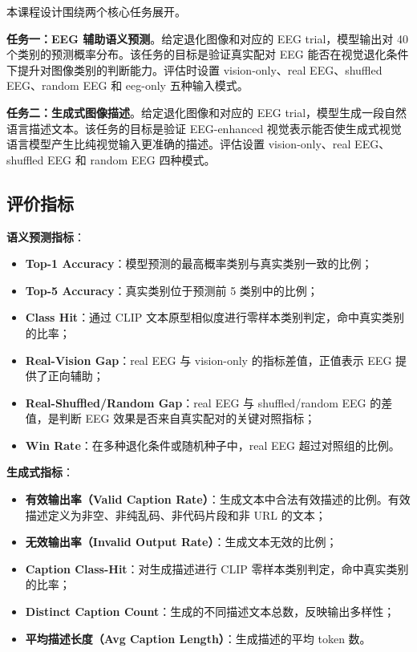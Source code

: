 本课程设计围绕两个核心任务展开。

\textbf{任务一：EEG 辅助语义预测}。给定退化图像和对应的 EEG trial，模型输出对 40 个类别的预测概率分布。该任务的目标是验证真实配对 EEG 能否在视觉退化条件下提升对图像类别的判断能力。评估时设置 vision-only、real EEG、shuffled EEG、random EEG 和 eeg-only 五种输入模式。

\textbf{任务二：生成式图像描述}。给定退化图像和对应的 EEG trial，模型生成一段自然语言描述文本。该任务的目标是验证 EEG-enhanced 视觉表示能否使生成式视觉语言模型产生比纯视觉输入更准确的描述。评估设置 vision-only、real EEG、shuffled EEG 和 random EEG 四种模式。

\subsection{评价指标}

\textbf{语义预测指标}：

\begin{itemize}
  \item \textbf{Top-1 Accuracy}：模型预测的最高概率类别与真实类别一致的比例；
  \item \textbf{Top-5 Accuracy}：真实类别位于预测前 5 类别中的比例；
  \item \textbf{Class Hit}：通过 CLIP 文本原型相似度进行零样本类别判定，命中真实类别的比率；
  \item \textbf{Real-Vision Gap}：real EEG 与 vision-only 的指标差值，正值表示 EEG 提供了正向辅助；
  \item \textbf{Real-Shuffled/Random Gap}：real EEG 与 shuffled/random EEG 的差值，是判断 EEG 效果是否来自真实配对的关键对照指标；
  \item \textbf{Win Rate}：在多种退化条件或随机种子中，real EEG 超过对照组的比例。
\end{itemize}

\textbf{生成式指标}：

\begin{itemize}
  \item \textbf{有效输出率（Valid Caption Rate）}：生成文本中合法有效描述的比例。有效描述定义为非空、非纯乱码、非代码片段和非 URL 的文本；
  \item \textbf{无效输出率（Invalid Output Rate）}：生成文本无效的比例；
  \item \textbf{Caption Class-Hit}：对生成描述进行 CLIP 零样本类别判定，命中真实类别的比率；
  \item \textbf{Distinct Caption Count}：生成的不同描述文本总数，反映输出多样性；
  \item \textbf{平均描述长度（Avg Caption Length）}：生成描述的平均 token 数。
\end{itemize}
